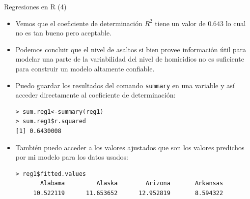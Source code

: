 \documentclass[handout]{beamer}
\begin{document}
\begin{frame}[fragile]{Regresiones en R (4)}
\scriptsize{
\begin{itemize}
 \item Vemos que el coeficiente de determinación $R^2$ tiene un valor de $0.643$ lo cual no es tan bueno pero aceptable.
 
 
  \item Podemos concluir que el nivel de asaltos si bien provee información útil para modelar una parte de la variabilidad del nivel de homicidios no es suficiente para construir un modelo altamente confiable. 
  
  \item Puedo guardar los resultados del comando \verb+summary+ en una variable y así acceder directamente al coeficiente de determinación:
\begin{verbatim}
> sum.reg1<-summary(reg1)
> sum.reg1$r.squared
[1] 0.6430008   
\end{verbatim}

\item También puedo acceder a los valores ajustados que son los valores predichos por mi modelo para los datos usados:
\begin{verbatim}
> reg1$fitted.values
       Alabama         Alaska        Arizona       Arkansas        
     10.522119      11.653652      12.952819       8.594322      
\end{verbatim}
 
 \end{itemize}
 

} 
\end{frame}
\end{document}
